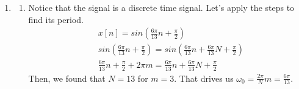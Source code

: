 \documentclass[10pt,a4paper, margin=1in]{article}
\begin{document}
\begin{enumerate}
\item %
    \begin{enumerate}   
    \item %
    Notice that the signal is a discrete time signal. Let's apply the steps to find its period.
    \begin{align*}
        &x[n]=sin(\frac{6\pi}{13}n+\frac{\pi}{2})\\
        &sin(\frac{6\pi}{13}n+\frac{\pi}{2}) = sin(\frac{6\pi}{13}n+\frac{6\pi}{13}N+\frac{\pi}{2}) \\
        &\frac{6\pi}{13}n+\frac{\pi}{2}+2\pi m =\frac{6\pi}{13}n+\frac{6\pi}{13}N+\frac{\pi}{2}
    \end{align*}
    Then, we found that $N=13$ for $m=3$. That drives us $\omega_0=\frac{2\pi}{N}m=\frac{6\pi}{13}.$\vspace{0.3cm}\\
    

\end{enumerate}
\end{enumerate}
\end{document}
